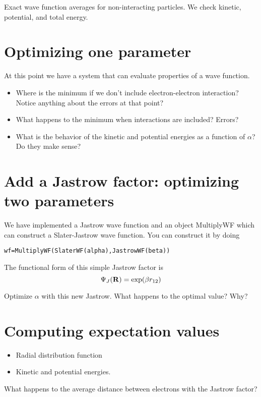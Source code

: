 \documentclass[12pt]{article}
\newcommand{\bR}{{\bf R}}
\begin{document}
Exact wave function averages for non-interacting particles. We check kinetic, potential, and total energy.

\section{Optimizing one parameter}

At this point we have a system that can evaluate properties of a wave function. 

\begin{itemize}
\item Where is the minimum if we don't include electron-electron interaction? Notice anything about the errors at that point?
\item What happens to the minimum when interactions are included? Errors?
\item What is the behavior of the kinetic and potential energies as a function of $\alpha$? Do they make sense?	
\end{itemize}


\section{Add a Jastrow factor: optimizing two parameters} 

We have implemented a Jastrow wave function and an object MultiplyWF which can construct a Slater-Jastrow wave function.
You can construct it by doing
\begin{verbatim}
wf=MultiplyWF(SlaterWF(alpha),JastrowWF(beta))	
\end{verbatim}
The functional form of this simple Jastrow factor is 
\begin{equation}
\Psi_J(\bR) = \exp(\beta r_{12})	
\end{equation}

Optimize $\alpha$ with this new Jastrow. What happens to the optimal value? Why? 

\section{Computing expectation values}

\begin{itemize}
\item Radial distribution function	
\item Kinetic and potential energies. 
\end{itemize}

What happens to the average distance between electrons with the Jastrow factor? 
\end{document}
